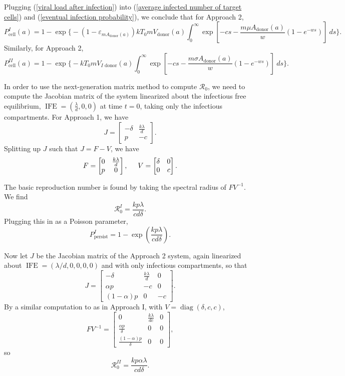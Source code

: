 \documentclass[]{elsarticle}
\newcommand{\Pcell}{P_{\text{cell}}}
\newcommand{\Vdonor}{V_{\text{donor}}}
\newcommand{\Adonor}{A_{\text{donor}}}
\newcommand{\IFE}{\operatorname{IFE}}
\newcommand{\BRN}{\mathcal{R}_0}
\theoremstyle{definition}
\begin{document}
Plugging (\ref{viral load after infection}) into (\ref{average infected number of target cells}) and (\ref{eventual infection probability}), we conclude that for Approach 2,
\begin{equation}
    \Pcell^I(a) = 1 - \exp\bigg\{-(1 - \varepsilon_{m\Adonor(a)}) kT_0m\Vdonor(a)
   \int_0^{\infty} \exp\left[-cs - \frac{m\mu \Adonor(a)}{w}(1 - e^{-ws})\right] ~ds\bigg\}.
    \label{pcell1}
\end{equation}
Similarly, for Approach 2,
\begin{equation}
    \Pcell^{II}(a)= 1 - \exp\bigg\{-kT_0mV_{I\text{ donor}}(a)\int_0^{\infty}\exp\left[-cs - \frac{m\sigma \Adonor(a)}{w}(1 - e^{-ws})\right] ~ds\bigg\}.
    \label{pcell2}
\end{equation}

In order to use the next-generation matrix method to compute $\BRN$, we need to compute the Jacobian matrix of the system linearized about the infectious free equilibrium, $\IFE = (\frac{\lambda}{d}, 0, 0)$ at time $t = 0$, taking only the infectious compartments. For Approach 1, we have
$$J = \begin{bmatrix}-\delta & \frac{k\lambda}{d}\\p &-c
\end{bmatrix}.$$
Splitting up $J$ such that $J=F-V$, we have
$$F = \begin{bmatrix}0& \frac{k\lambda}{d}\\ p&0\end{bmatrix}, \hspace{5mm}
V =  \begin{bmatrix} \delta & 0\\ 0&c\end{bmatrix}.$$

The basic reproduction number is found by taking the spectral radius of $FV^{-1}$. We find
$$\BRN^I = \frac{kp\lambda}{cd\delta}.$$
Plugging this in as a Poisson parameter,
\begin{equation}
    P_\text{persist}^I = 1-\exp\left(\frac{kp\lambda}{cd\delta}\right).
    \label{ppersist1}
    \end{equation}

Now let $J$ be the Jacobian matrix of the Approach 2 system, again linearized about $\IFE = (\lambda/d, 0, 0, 0, 0)$ and with only infectious compartments, so that
$$J = \begin{bmatrix}
    -\delta & \frac{k\lambda}{d}& 0\\
    \alpha p & -c & 0\\
    (1-\alpha)p & 0 & -c\end{bmatrix}.$$
By a similar computation to as in Approach I, with $V = \operatorname{diag}(\delta, c, c)$,
$$FV^{-1} = \begin{bmatrix}
    0 & \frac{k\lambda}{dc} & 0\\
    \frac{\alpha p}{\delta} & 0 & 0\\
    \frac{(1-\alpha)p}{\delta} & 0 & 0
\end{bmatrix},$$
so
$$\BRN^{II} = \frac{kp\alpha\lambda}{cd\delta}.$$
\end{document}
